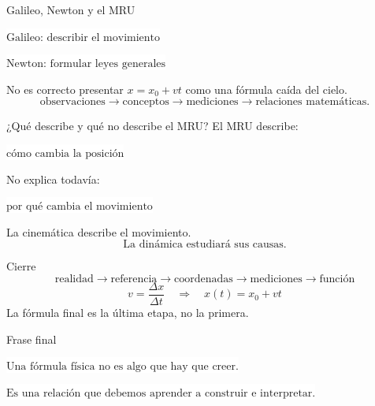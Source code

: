 \documentclass[aspectratio=169,11pt]{beamer}
\newcommand{\caja}[1]{%
  \begin{center}
  \setlength{\fboxsep}{9pt}
  \colorbox{white}{\(\displaystyle \boxed{#1}\)}
  \end{center}
}
\begin{document}
\begin{frame}{Galileo, Newton y el MRU}
  \caja{\text{Galileo: describir el movimiento}}
  \caja{\text{Newton: formular leyes generales}}
  \vspace{0.4em}
  No es correcto presentar \(x=x_0+vt\) como una fórmula caída del cielo.
  \[
    \text{observaciones}
    \longrightarrow
    \text{conceptos}
    \longrightarrow
    \text{mediciones}
    \longrightarrow
    \text{relaciones matemáticas}.
  \]
\end{frame}

\begin{frame}{¿Qué describe y qué no describe el MRU?}
  El MRU describe:
  \caja{\text{cómo cambia la posición}}
  No explica todavía:
  \caja{\text{por qué cambia el movimiento}}
  \vspace{0.5em}
  La cinemática describe el movimiento.
  \[
    \text{La dinámica estudiará sus causas.}
  \]
\end{frame}

\begin{frame}{Cierre}
  \[
    \boxed{
    \text{realidad}
    \rightarrow
    \text{referencia}
    \rightarrow
    \text{coordenadas}
    \rightarrow
    \text{mediciones}
    \rightarrow
    \text{función}}
  \]
  \[
    \boxed{
    v=\frac{\Delta x}{\Delta t}
    \quad\Longrightarrow\quad
    x(t)=x_0+vt}
  \]
  \vspace{0.5em}
  La fórmula final es la última etapa, no la primera.
\end{frame}

\begin{frame}{Frase final}
  \caja{\text{Una fórmula física no es algo que hay que creer.}}
  \vspace{1em}
  \caja{\text{Es una relación que debemos aprender a construir e interpretar.}}
\end{frame}
\end{document}

